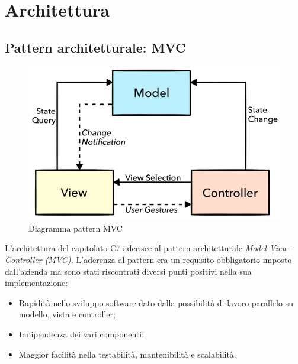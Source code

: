 \section{Architettura}
\subsection{Pattern architetturale: MVC}
\begin{figure}[H]
    \centering
    \includegraphics[scale = 1]{components/img/mvc-generico.png}
    \caption{Diagramma pattern MVC}
    \label{fig:diagramma MVC generico}
\end{figure}
L'architettura del capitolato C7 aderisce al pattern architetturale \textit{Model-View-Controller (MVC).} L'aderenza al pattern era un requisito obbligatorio imposto dall'azienda ma sono stati riscontrati diversi punti positivi nella sua implementazione:

\begin{itemize}
	\item Rapidità nello sviluppo software dato dalla possibilità di lavoro parallelo su modello, vista e controller;
	\item Indipendenza dei vari componenti;
	\item Maggior facilità nella testabilità, mantenibilità e scalabilità.

\end{itemize}
